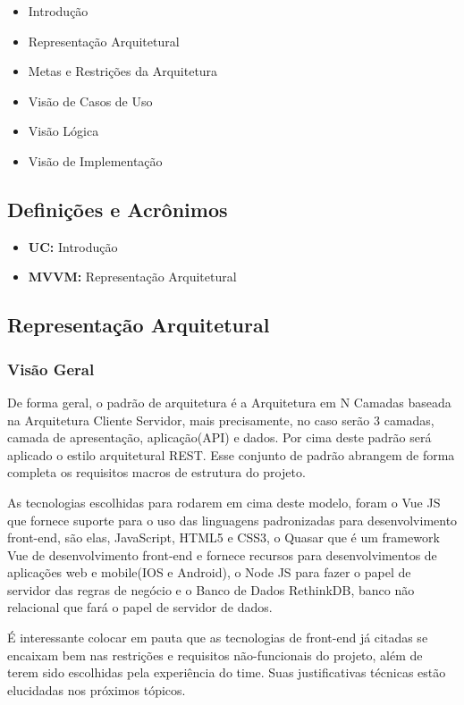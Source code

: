 \begin{apendicesenv}
\begin{itemize}
    \item Introdução
    \item Representação Arquitetural
    \item Metas e Restrições da Arquitetura
    \item Visão de Casos de Uso
    \item Visão Lógica
    \item Visão de Implementação
\end{itemize}

\subsection{Definições e Acrônimos}
\begin{itemize}
    \item \textbf{UC:} Introdução
    \item \textbf{MVVM:} Representação Arquitetural
\end{itemize}

\subsection{Representação Arquitetural}

\subsubsection{Visão Geral}
De forma geral, o padrão de arquitetura é a Arquitetura em N Camadas baseada na Arquitetura Cliente Servidor, mais precisamente, no caso serão 3 camadas, camada de apresentação, aplicação(API) e dados. Por cima deste padrão será aplicado o estilo arquitetural REST. Esse conjunto de padrão abrangem de forma completa os requisitos macros de estrutura do projeto.

As tecnologias escolhidas para rodarem em cima deste modelo, foram o Vue JS que fornece suporte para o uso das linguagens padronizadas para desenvolvimento front-end, são
elas, JavaScript, HTML5 e CSS3, o Quasar que é um framework Vue de desenvolvimento front-end e fornece recursos para desenvolvimentos de aplicações web e mobile(IOS e Android), o Node JS para fazer o papel de servidor das regras de negócio e o Banco de Dados RethinkDB, banco não relacional que fará o papel de servidor de dados.

É interessante colocar em pauta que as tecnologias de front-end já citadas se encaixam bem nas restrições e requisitos não-funcionais do projeto, além de terem sido escolhidas pela experiência do time. Suas justificativas técnicas estão elucidadas nos próximos tópicos.


\end{apendicesenv}
